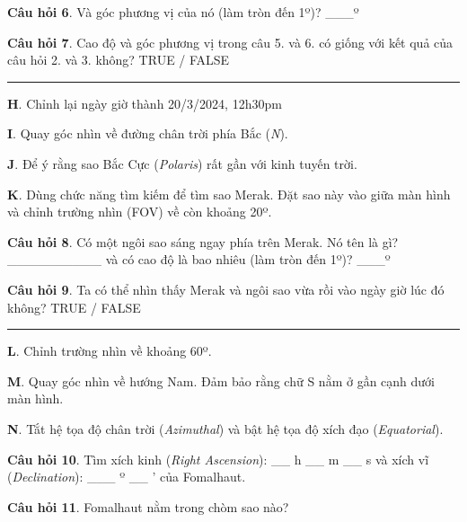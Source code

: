 \documentclass[
  a4paper,
]{book}
\begin{document}
\textbf{Câu hỏi 6}. Và góc phương vị của nó (làm tròn đến 1º)?
\_\_\_º

\textbf{Câu hỏi 7}. Cao độ và góc phương vị trong câu 5. và 6. có giống với kết quả của câu hỏi 2. và 3. không?
TRUE / FALSE

\begin{center}\rule{0.5\linewidth}{0.5pt}\end{center}

\textbf{H}. Chỉnh lại ngày giờ thành 20/3/2024, 12h30pm

\textbf{I}. Quay góc nhìn về đường chân trời phía Bắc (\emph{N}).

\textbf{J}. Để ý rằng sao Bắc Cực (\emph{Polaris}) rất gần với kinh tuyến trời.

\textbf{K}. Dùng chức năng tìm kiếm để tìm sao Merak. Đặt sao này vào giữa màn hình và chỉnh trường nhìn (FOV) về còn khoảng 20º.

\textbf{Câu hỏi 8}. Có một ngôi sao sáng ngay phía trên Merak. Nó tên là gì?
\_\_\_\_\_\_\_\_\_\_
và có cao độ là bao nhiêu (làm tròn đến 1º)?
\_\_\_º

\textbf{Câu hỏi 9}. Ta có thể nhìn thấy Merak và ngôi sao vừa rồi vào ngày giờ lúc đó không?
TRUE / FALSE

\begin{center}\rule{0.5\linewidth}{0.5pt}\end{center}

\textbf{L}. Chỉnh trường nhìn về khoảng 60º.

\textbf{M}. Quay góc nhìn về hướng Nam. Đảm bảo rằng chữ S nằm ở gần cạnh dưới màn hình.

\textbf{N}. Tắt hệ tọa độ chân trời (\emph{Azimuthal}) và bật hệ tọa độ xích đạo (\emph{Equatorial}).

\textbf{Câu hỏi 10}. Tìm xích kinh (\emph{Right Ascension}):
\_\_ h
\_\_ m
\_\_ s
và xích vĩ (\emph{Declination}):
\_\_\_ º
\_\_ '
của Fomalhaut.

\textbf{Câu hỏi 11}. Fomalhaut nằm trong chòm sao nào?
\end{document}
